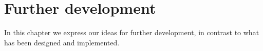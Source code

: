 \chapter{Further development}

In this chapter we express our ideas for further development, in contrast to what has been designed and implemented.
